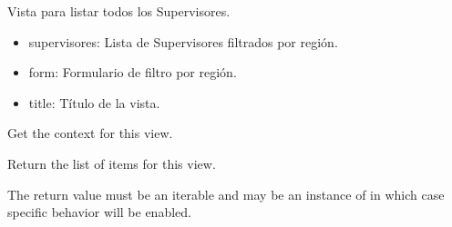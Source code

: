 \documentclass[letterpaper,10pt,spanish]{sphinxmanual}
\begin{document}
\begin{fulllineitems}

\pysigstartsignatures
{}
\pysigstopsignatures
\sphinxAtStartPar
Vista para listar todos los Supervisores.
\begin{description}
\begin{itemize}
\item {} 
\sphinxAtStartPar
supervisores: Lista de Supervisores filtrados por región.

\item {} 
\sphinxAtStartPar
form: Formulario de filtro por región.

\item {} 
\sphinxAtStartPar
title: Título de la vista.

\end{itemize}

\end{description}


\begin{fulllineitems}

\pysigstartsignatures
{}
\pysigstopsignatures
\end{fulllineitems}



\begin{fulllineitems}

\pysigstartsignatures
{}
\pysigstopsignatures
\sphinxAtStartPar
Get the context for this view.

\end{fulllineitems}



\begin{fulllineitems}

\pysigstartsignatures
{}
\pysigstopsignatures
\sphinxAtStartPar
Return the list of items for this view.

\sphinxAtStartPar
The return value must be an iterable and may be an instance of
 in which case  specific behavior will be enabled.


\end{fulllineitems}
\end{fulllineitems}
\end{document}
